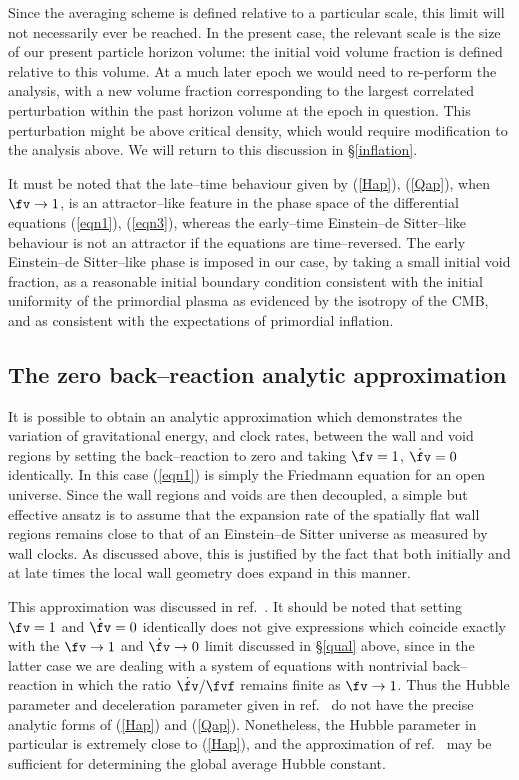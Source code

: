 \documentclass[12pt]{iopart}
\begin{document}
Since the averaging scheme is defined
relative to a particular scale, this limit will not necessarily
ever be reached. In the present case, the relevant scale is the size
of our present particle horizon volume: the initial void volume fraction
is defined relative to this volume. At a much
later epoch we would need to re-perform the analysis, with a new volume
fraction corresponding to the largest correlated perturbation within the
past horizon volume at the epoch in question. This perturbation might be
above critical density, which would require modification to the analysis
above. We will return to this discussion in \S\ref{inflation}.

It must be noted that the late--time behaviour given by (\ref{Hap}),
(\ref{Qap}), when $\fv\to1$, is an attractor--like feature in the phase
space of the differential equations (\ref{eqn1}), (\ref{eqn3}), whereas
the early--time Einstein--de Sitter--like behaviour is not an attractor
if the equations are time--reversed. The early Einstein--de Sitter--like
phase is imposed in our case, by taking a small initial void fraction,
as a reasonable initial boundary condition consistent with the initial
uniformity of the primordial plasma as evidenced by the isotropy of the
CMB, and as consistent with the expectations of primordial inflation.

\subsection{The zero back--reaction analytic approximation\label{anap}}

It is possible to obtain an analytic approximation which demonstrates
the variation of gravitational energy, and clock rates, between the
wall and void regions by setting the back--reaction to zero and taking
$\fv=1$, $\dot\fv=0$ identically. In this case (\ref{eqn1}) is simply
the Friedmann equation for an open universe. Since the wall regions and
voids are then decoupled, a simple but effective ansatz is to assume
that the expansion rate of the spatially flat wall regions remains
close to that of an Einstein--de Sitter universe as measured by wall
clocks. As discussed above, this is justified by the fact that both
initially and at late times the local wall geometry does
expand in this manner.

This approximation was discussed in ref.\ \cite{paper0}. It should be noted
that setting $\fv=1$ and $\dot\fv=0$ identically does not give expressions
which coincide exactly with the $\fv\to1$ and $\dot\fv\to0$ limit discussed
in \S\ref{qual} above, since in the latter case we are dealing with
a system of equations with nontrivial back--reaction in which the ratio
$\dot\fv/\fvf$ remains finite as $\fv\to1$. Thus the Hubble parameter
and deceleration parameter given in ref.\ \cite{paper0} do not have
the precise analytic forms of (\ref{Hap}) and (\ref{Qap}). Nonetheless,
the Hubble parameter in particular is extremely close to (\ref{Hap}), and
the approximation of ref.\ \cite{paper0} may be sufficient for determining
the global average Hubble constant.
\end{document}

